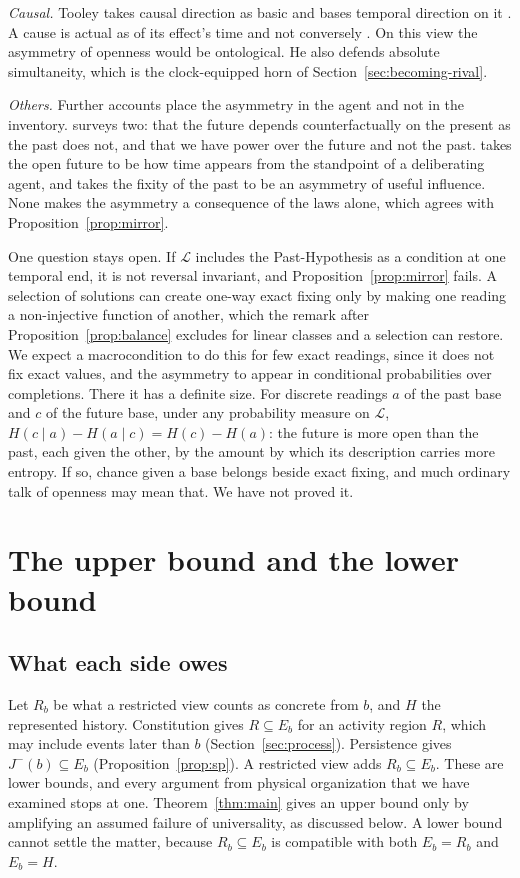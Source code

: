 \documentclass[11pt]{article}
\theoremstyle{definition}
\newcommand{\Jm}{J^{-}}
\begin{document}
\emph{Causal.} Tooley takes causal direction as basic and bases temporal direction on it \citep{Tooley1997}. A cause is actual as of its effect's time and not conversely \citep{Tooley2010}. On this view the asymmetry of openness would be ontological. He also defends absolute simultaneity, which is the clock-equipped horn of Section~\ref{sec:becoming-rival}.

\emph{Others.} Further accounts place the asymmetry in the agent and not in the inventory. \citet{Torre2011} surveys two: that the future depends counterfactually on the present as the past does not, and that we have power over the future and not the past. \citet{Ismael2012} takes the open future to be how time appears from the standpoint of a deliberating agent, and \citet{Kutach2011} takes the fixity of the past to be an asymmetry of useful influence. None makes the asymmetry a consequence of the laws alone, which agrees with Proposition~\ref{prop:mirror}.

One question stays open. If $\mathcal L$ includes the Past-Hypothesis as a condition at one temporal end, it is not reversal invariant, and Proposition~\ref{prop:mirror} fails. A selection of solutions can create one-way exact fixing only by making one reading a non-injective function of another, which the remark after Proposition~\ref{prop:balance} excludes for linear classes and a selection can restore. We expect a macrocondition to do this for few exact readings, since it does not fix exact values, and the asymmetry to appear in conditional probabilities over completions. There it has a definite size. For discrete readings $a$ of the past base and $c$ of the future base, under any probability measure on $\mathcal L$, $H(c\mid a)-H(a\mid c)=H(c)-H(a)$: the future is more open than the past, each given the other, by the amount by which its description carries more entropy. If so, chance given a base belongs beside exact fixing, and much ordinary talk of openness may mean that. We have not proved it.

\section{The upper bound and the lower bound}\label{sec:bounds}

\subsection{What each side owes}

Let $R_b$ be what a restricted view counts as concrete from $b$, and $H$ the represented history. Constitution gives $R\subseteq E_b$ for an activity region $R$, which may include events later than $b$ (Section~\ref{sec:process}). Persistence gives $\Jm(b)\subseteq E_b$ (Proposition~\ref{prop:sp}). A restricted view adds $R_b\subseteq E_b$. These are lower bounds, and every argument from physical organization that we have examined stops at one. Theorem~\ref{thm:main} gives an upper bound only by amplifying an assumed failure of universality, as discussed below. A lower bound cannot settle the matter, because $R_b\subseteq E_b$ is compatible with both $E_b=R_b$ and $E_b=H$.
\end{document}
